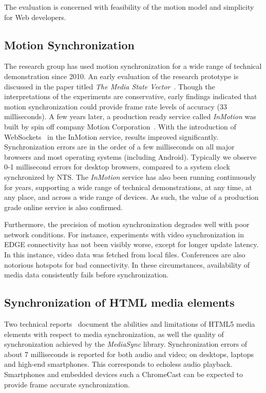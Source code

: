 The evaluation is concerned with feasibility of the motion model and
simplicity for Web developers.


\subsection {Motion Synchronization}

The research group has used motion synchronization for a wide range of
technical demonstration since 2010. An early evaluation of the research
prototype is discussed in the paper titled \emph{The Media State
Vector}~\cite{msv}. Though the interpretations of the experiments are
conservative, early findings indicated that motion synchronization could
provide frame rate levels of accuracy (33 milliseconds). A few years later, a
production ready service called \emph{InMotion} was built by spin off company
Motion Corporation~\cite{mcorp}. With the introduction of
WebSockets~\cite{websocket} in the InMotion service, results improved
significantly. Synchronization errors are in the order of a few milliseconds
on all major browsers and most operating systems (including Android).
Typically we observe 0-1 millisecond errors for desktop browsers, compared to
a system clock synchronized by NTS. The \emph{InMotion} service has also been
running continuously for years, supporting a wide range of technical
demonstrations, at any time, at any place, and across a wide range of devices.
As such, the value of a production grade online service is also confirmed.

Furthermore, the precision of motion synchronization degrades well with poor
network conditions. For instance, experiments with video synchronization in
EDGE connectivity has not been visibly worse, except for longer update
latency. In this instance, video data was fetched from local files.
Conferences are also notorious hotspots for bad connectivity. In these
circumstances, availability of media data consistently fails before
synchronization.


\subsection {Synchronization of HTML media elements}

Two technical reports~\cite{syncreport1,syncreport2} document the abilities
and limitations of HTML5 media elements with respect to media synchronization,
as well the quality of synchronization achieved by the \emph{MediaSync}
library. Synchronization errors of about 7 milliseconds is reported for both
audio and video; on desktops, laptops and high-end smartphones. This
corresponds to echoless audio playback. Smartphones and embedded devices such
a ChromeCast can be expected to provide frame accurate synchronization. 

